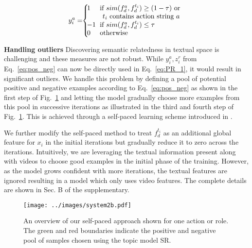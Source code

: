 \documentclass[10pt,twocolumn,letterpaper]{article}
\begin{document}
\vspace*{-6pt}
\begin{eqnarray}\label{eq:pos_neg}
  y_i^a = \hspace*{-3pt} \left\{
  \begin{array}{l l}
    \hspace*{-7pt} 1 & \hspace*{-4pt} \text{if $sim(f_{d}^a, f_{d}^{t_i}) \geq (1 - \tau)$ \text{or}} \\
   & \text{$t_i$ contains action string $a$}\\
   \hspace*{-7pt} -1 & \hspace*{-4pt} \text{if $sim(f_{d}^a, f_{d}^{t_i}) \leq \tau$}\\
   \hspace*{-7pt} 0 & \hspace*{-4pt} \text{otherwise}
  \end{array} \right.
\end{eqnarray}


\noindent \textbf{Handling outliers} \label{sec:SPL}
Discovering semantic relatedness in textual space is challenging and these measures are not robust. While $y_i^a, z_i^r$ from Eq.~\ref{eq:pos_neg} can now be directly used in Eq.~\ref{eq:PR_1}, it would result in significant outliers. We handle this problem by defining a pool of potential positive and negative examples according to Eq.~\ref{eq:pos_neg} as shown in the first step of Fig.~\ref{fig:system2} and letting the model gradually choose more examples from this pool in successive iterations as illustrated in the third and fourth step of Fig.~\ref{fig:system2}. This is achieved through a self-paced learning scheme introduced in \cite{Kumar_NIPS10}. 

We further modify the self-paced method to treat $f_{d}^{t_i}$ as an additional
global feature for $x_i$ in the initial iterations but gradually
reduce it to zero across the iterations.
Intuitively, we are leveraging the textual
information present along with videos to choose good examples in the initial
phase of the training. However, as the model grows confident with more
iterations, the textual features are ignored resulting in a model which only
uses video features. The complete details are shown in Sec. B of the supplementary.


\begin{figure}
  \texttt{[image: ../images/system2b.pdf]}
  \caption{An overview of our self-paced approach shown for one action or role. 
  The green and red boundaries indicate the positive and negative pool of samples chosen using the topic model SR.}
\label{fig:system2}
\end{figure}
\end{document}
